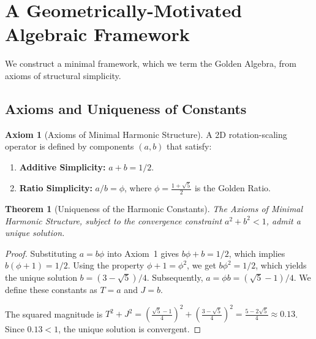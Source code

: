 \documentclass{amsart}
\theoremstyle{plain}
\newtheorem{theorem}{Theorem}[section]
\theoremstyle{definition}
\newtheorem{axiom}{Axiom}
\theoremstyle{remark}
\begin{document}
\section{A Geometrically-Motivated Algebraic Framework}
We construct a minimal framework, which we term the Golden Algebra, from axioms of structural simplicity.

\subsection{Axioms and Uniqueness of Constants}
\begin{axiom}[Axioms of Minimal Harmonic Structure]
A 2D rotation-scaling operator is defined by components $(a,b)$ that satisfy:
\begin{enumerate}
    \item \textbf{Additive Simplicity:} $a+b = 1/2$.
    \item \textbf{Ratio Simplicity:} $a/b = \phi$, where $\phi = \frac{1+\sqrt{5}}{2}$ is the Golden Ratio.
\end{enumerate}
\end{axiom}

\begin{theorem}[Uniqueness of the Harmonic Constants]
The Axioms of Minimal Harmonic Structure, subject to the convergence constraint $a^2+b^2 < 1$, admit a unique solution.
\end{theorem}
\begin{proof}
Substituting $a=b\phi$ into Axiom~1 gives $b\phi+b=1/2$, which implies $b(\phi+1)=1/2$. Using the property $\phi+1=\phi^2$, we get $b\phi^2=1/2$, which yields the unique solution $b=(3-\sqrt{5})/4$. Subsequently, $a=\phi b = (\sqrt{5}-1)/4$. We define these constants as $T=a$ and $J=b$.

The squared magnitude is $T^2+J^2 = \left(\frac{\sqrt{5}-1}{4}\right)^2 + \left(\frac{3-\sqrt{5}}{4}\right)^2 = \frac{5-2\sqrt{5}}{4} \approx 0.13$. Since $0.13 < 1$, the unique solution is convergent.
\end{proof}
\end{document}
